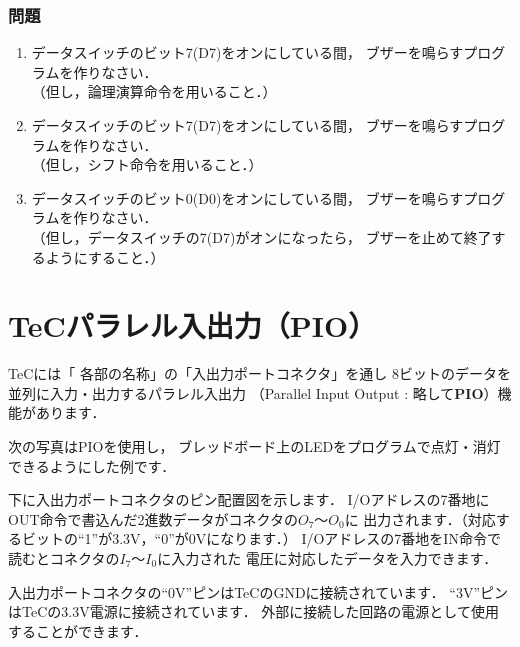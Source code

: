 \vfill
\subsubsection{問題}
\begin{enumerate}
\item データスイッチのビット7(D7)をオンにしている間，
ブザーを鳴らすプログラムを作りなさい．\\
（但し，論理演算命令を用いること．）
\item データスイッチのビット7(D7)をオンにしている間，
ブザーを鳴らすプログラムを作りなさい．\\
（但し，シフト命令を用いること．）
\item データスイッチのビット0(D0)をオンにしている間，
ブザーを鳴らすプログラムを作りなさい．\\
（但し，データスイッチの7(D7)がオンになったら，
ブザーを止めて終了するようにすること．）
\end{enumerate}
\vfill

\newpage
\section{TeCパラレル入出力（PIO）}
\label{pio}

TeCには「 各部の名称」の「入出力ポートコネクタ」を通し
8ビットのデータを並列に入力・出力するパラレル入出力
（Parallel Input Output : 略して{\bf PIO}）機能があります．

次の写真はPIOを使用し，
ブレッドボード上のLEDをプログラムで点灯・消灯できるようにした例です．


\begin{center}
\end{center}

下に入出力ポートコネクタのピン配置図を示します．
I/Oアドレスの7番地にOUT命令で書込んだ2進数データがコネクタの$O_7$〜$O_0$に
出力されます．（対応するビットの``1''が3.3V，``0''が0Vになります．）
I/Oアドレスの7番地をIN命令で読むとコネクタの$I_7$〜$I_0$に入力された
電圧に対応したデータを入力できます．

入出力ポートコネクタの``0V''ピンはTeCのGNDに接続されています．
``3V''ピンはTeCの3.3V電源に接続されています．
外部に接続した回路の電源として使用することができます．

